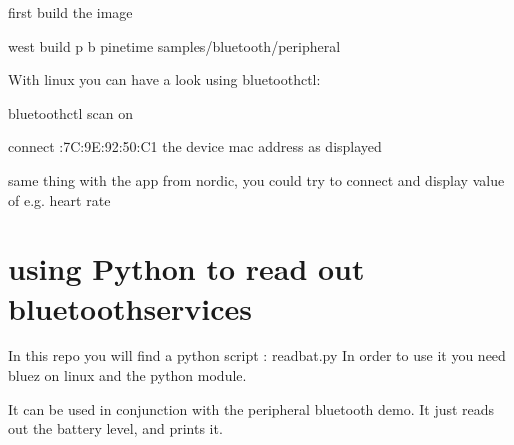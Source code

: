 \documentclass[letterpaper,10pt,english]{sphinxmanual}
\begin{document}
first build the image

\begin{sphinxVerbatim}[commandchars=\\\{\}]
  west build \PYGZhy{}p \PYGZhy{}b pinetime samples/bluetooth/peripheral
\end{sphinxVerbatim}

With linux you can have a look using bluetoothctl:

\begin{sphinxVerbatim}[commandchars=\\\{\}]
bluetoothctl
scan on


connect :7C:9E:92:50:C1 the device mac address as displayed

\end{sphinxVerbatim}

same thing with the app from nordic, you could try to connect and display value of e.g. heart rate


\section{using Python to read out bluetoothservices}
\label{\detokenize{bluetooth:using-python-to-read-out-bluetoothservices}}
In this repo you will find a python script : readbat.py
In order to use it you need bluez on linux and the python  module.

It can be used in conjunction with the peripheral bluetooth demo.
It just reads out the battery level, and prints it.

\begin{sphinxVerbatim}[commandchars=\\\{\}]
 
    

  

   

     \PYG{p}{[}\PYG{p}{]}
    
\end{sphinxVerbatim}
\end{document}
